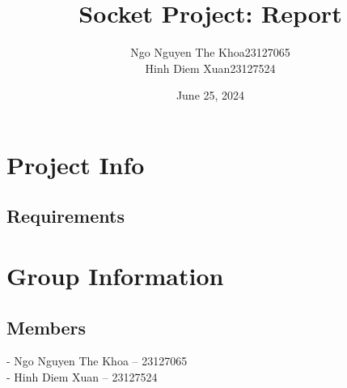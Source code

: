\documentclass[a4paper,12pt]{report}
\title{Socket Project: Report}
\author{\begin{tabular}{r c}
  Ngo Nguyen The Khoa & 23127065\\
  Hinh Diem Xuan      & 23127524\\
  \end{tabular}}
\date{June 25, 2024} %
\begin{document}

\tableofcontents\thispagestyle{empty}

\pagebreak
\section{Project Info}
\subsection{Requirements}

\pagebreak
\section{Group Information}
\subsection*{Members}
\begin{flushleft}
  - Ngo Nguyen The Khoa -- 23127065\\
  - Hinh Diem Xuan -- 23127524
\end{flushleft}
\end{document}
